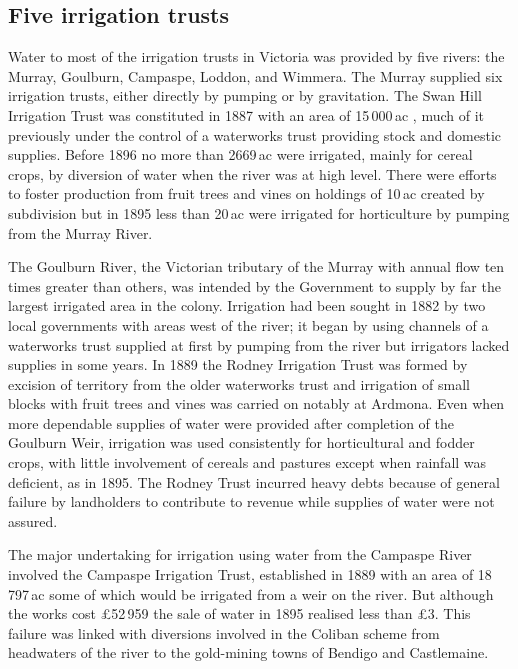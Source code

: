 \subsection*{Five irrigation trusts}

Water to most of the irrigation trusts in Victoria was provided by
five rivers: the Murray, Goulburn, Campaspe, Loddon, and Wimmera.  The
Murray supplied six irrigation trusts, either directly by pumping or
by gravitation.  The Swan Hill Irrigation Trust was constituted in
1887 with an area of 15\,000\,ac , much of it previously under the
control of a waterworks trust providing stock and domestic supplies.
Before 1896 no more than 2669\,ac were irrigated, mainly for cereal
crops, by diversion of water when the river was at high level. There
were efforts to foster production from fruit trees and vines on
holdings of 10\,ac created by subdivision but in 1895 less than 20\,ac
were irrigated for horticulture by pumping from the Murray
River.

The Goulburn River, the Victorian tributary of the Murray with annual
flow ten times greater than others, was intended by the Government to
supply by far the largest irrigated area in the colony.  Irrigation
had been sought in 1882 by two local governments with areas west of
the river; it began by using channels of a waterworks trust supplied
at first by pumping from the river but irrigators lacked supplies in
some years.  In 1889 the Rodney Irrigation Trust was formed by
excision of territory from the older waterworks trust and irrigation
of small blocks with fruit trees and vines was carried on notably at
Ardmona.  Even when more dependable supplies of water were provided
after completion of the Goulburn Weir, irrigation was used
consistently for horticultural and fodder crops, with little
involvement of cereals and pastures except when rainfall was
deficient, as in 1895.  The Rodney Trust incurred heavy debts
because of general failure by landholders to contribute to revenue
while supplies of water were not assured.

The major undertaking for irrigation using water from the Campaspe
River involved the Campaspe Irrigation Trust, established in 1889 with
an area of 18\,797\,ac some of which would be irrigated from a weir on
the river.  But although the works cost \pounds52\,959 the sale of
water in 1895 realised less than \pounds3. This failure was linked
with diversions involved in the Coliban scheme from headwaters of the
river to the gold-mining towns of Bendigo and Castlemaine.

